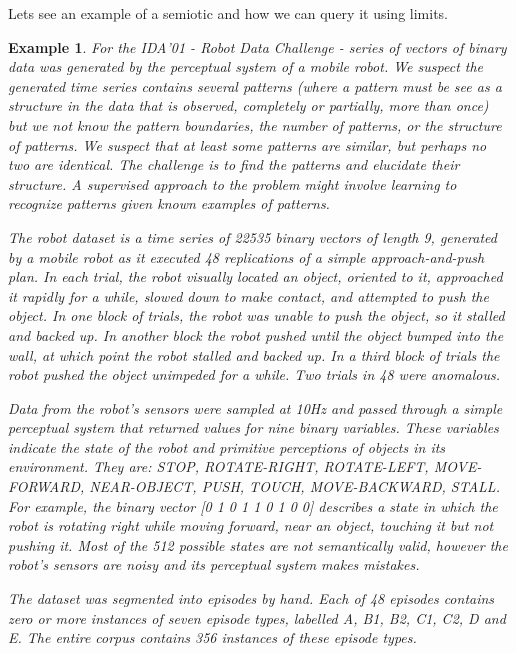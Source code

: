 \documentclass[oribibl]{llncs}
\newtheorem{exam}{Example}
\begin{document}
Lets see an example of a semiotic and how we can query it using limits.
\begin{exam}\cite{Cohen01}
For the IDA'01 - Robot Data Challenge - series of vectors of binary data was generated by the perceptual system of a mobile robot. We suspect the generated time series contains several patterns (where a pattern must be see as a structure in the data that is observed, completely or partially, more than once) but we not know the pattern boundaries, the number of patterns, or the structure of patterns. We suspect that at least some patterns are similar, but perhaps no two are identical. The challenge is to find the patterns and elucidate their structure. A supervised approach to the problem might involve learning to recognize patterns given known examples of patterns.

The robot dataset is a time series of 22535 binary vectors of length 9, generated by a mobile robot as it executed 48 replications of a simple approach-and-push plan. In each trial, the robot visually located an object, oriented to it, approached it rapidly for a while, slowed down to make contact, and attempted to push the object. In one block of trials, the robot was unable to push the object, so it stalled and backed up. In another block the robot pushed until the object bumped into the wall, at which point the robot stalled and backed up. In a third block of trials the robot pushed the object unimpeded for a while. Two trials in 48 were anomalous.

Data from the robot's sensors were sampled at 10Hz and passed through a simple perceptual system that returned values for nine binary variables. These variables indicate the state of the robot and primitive perceptions of objects in its environment. They are: STOP, ROTATE-RIGHT, ROTATE-LEFT, MOVE-FORWARD, NEAR-OBJECT, PUSH, TOUCH, MOVE-BACKWARD, STALL. For example, the binary vector [0 1 0 1 1 0 1 0 0] describes a state in which the robot is rotating right while moving forward, near an object, touching it but not pushing it. Most of the 512 possible states are not semantically valid, however the robot's sensors are noisy and its perceptual system makes mistakes.

The dataset was segmented into episodes by hand. Each of 48 episodes  contains zero or more instances of seven episode types, labelled A, B1, B2, C1, C2, D and E. The entire corpus contains 356 instances of these episode types.


\end{exam}
\end{document}
